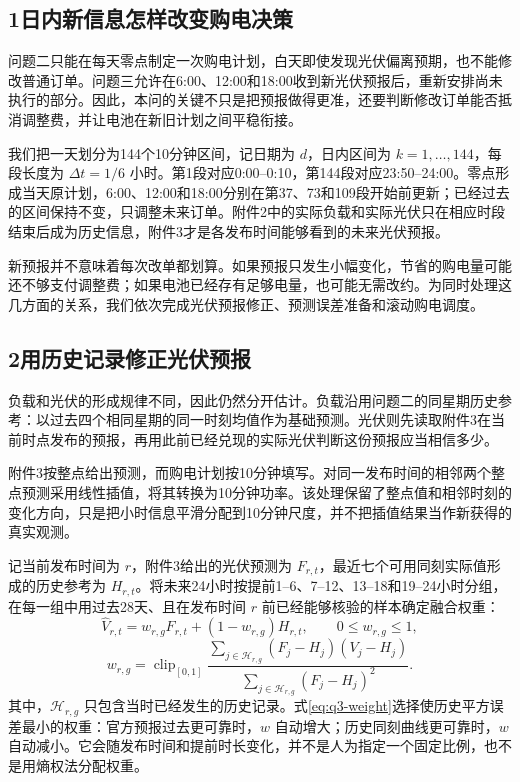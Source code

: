 \subsection*{1\quad 日内新信息怎样改变购电决策}

问题二只能在每天零点制定一次购电计划，白天即使发现光伏偏离预期，也不能修改普通订单。问题三允许在6:00、12:00和18:00收到新光伏预报后，重新安排尚未执行的部分。因此，本问的关键不只是把预报做得更准，还要判断修改订单能否抵消调整费，并让电池在新旧计划之间平稳衔接。

我们把一天划分为144个10分钟区间，记日期为 $d$，日内区间为 $k=1,\ldots,144$，每段长度为 $\Delta t=1/6$ 小时。第1段对应0:00--0:10，第144段对应23:50--24:00。零点形成当天原计划，6:00、12:00和18:00分别在第37、73和109段开始前更新；已经过去的区间保持不变，只调整未来订单。附件2中的实际负载和实际光伏只在相应时段结束后成为历史信息，附件3才是各发布时间能够看到的未来光伏预报。

新预报并不意味着每次改单都划算。如果预报只发生小幅变化，节省的购电量可能还不够支付调整费；如果电池已经存有足够电量，也可能无需改约。为同时处理这几方面的关系，我们依次完成光伏预报修正、预测误差准备和滚动购电调度。

\subsection*{2\quad 用历史记录修正光伏预报}

负载和光伏的形成规律不同，因此仍然分开估计。负载沿用问题二的同星期历史参考：以过去四个相同星期的同一时刻均值作为基础预测。光伏则先读取附件3在当前时点发布的预报，再用此前已经兑现的实际光伏判断这份预报应当相信多少。

附件3按整点给出预测，而购电计划按10分钟填写。对同一发布时间的相邻两个整点预测采用线性插值，将其转换为10分钟功率。该处理保留了整点值和相邻时刻的变化方向，只是把小时信息平滑分配到10分钟尺度，并不把插值结果当作新获得的真实观测。

记当前发布时间为 $r$，附件3给出的光伏预测为 $F_{r,t}$，最近七个可用同刻实际值形成的历史参考为 $H_{r,t}$。将未来24小时按提前1--6、7--12、13--18和19--24小时分组，在每一组中用过去28天、且在发布时间 $r$ 前已经能够核验的样本确定融合权重：
\begin{equation}
\widehat V_{r,t}=w_{r,g}F_{r,t}+(1-w_{r,g})H_{r,t},
\qquad 0\le w_{r,g}\le1,
\label{eq:q3-fusion}
\end{equation}
\begin{equation}
w_{r,g}=\operatorname{clip}_{[0,1]}
\frac{\sum_{j\in\mathcal H_{r,g}}(F_j-H_j)(V_j-H_j)}
{\sum_{j\in\mathcal H_{r,g}}(F_j-H_j)^2}.
\label{eq:q3-weight}
\end{equation}
其中，$\mathcal H_{r,g}$ 只包含当时已经发生的历史记录。式\eqref{eq:q3-weight}选择使历史平方误差最小的权重：官方预报过去更可靠时，$w$ 自动增大；历史同刻曲线更可靠时，$w$ 自动减小。它会随发布时间和提前时长变化，并不是人为指定一个固定比例，也不是用熵权法分配权重。

